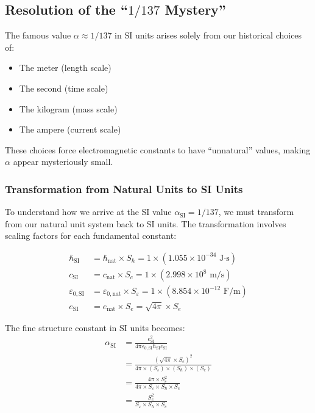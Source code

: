 	\subsection{Resolution of the ``$1/137$ Mystery''}
	
	The famous value $\alpha \approx 1/137$ in SI units arises solely from our historical choices of:
	\begin{itemize}
		\item The meter (length scale)
		\item The second (time scale)  
		\item The kilogram (mass scale)
		\item The ampere (current scale)
	\end{itemize}
	
	These choices force electromagnetic constants to have ``unnatural'' values, making $\alpha$ appear mysteriously small.
	
	\subsubsection{Transformation from Natural Units to SI Units}
	
	To understand how we arrive at the SI value $\alpha_{\text{SI}} = 1/137$, we must transform from our natural unit system back to SI units. The transformation involves scaling factors for each fundamental constant:
	
	\begin{align}
		\hbar_{\text{SI}} &= \hbar_{\text{nat}} \times S_{\hbar} = 1 \times (1.055 \times 10^{-34} \text{ J·s})\\
		c_{\text{SI}} &= c_{\text{nat}} \times S_c = 1 \times (2.998 \times 10^8 \text{ m/s})\\
		\varepsilon_{0,\text{SI}} &= \varepsilon_{0,\text{nat}} \times S_{\varepsilon} = 1 \times (8.854 \times 10^{-12} \text{ F/m})\\
		e_{\text{SI}} &= e_{\text{nat}} \times S_e = \sqrt{4\pi} \times S_e
	\end{align}
	
	The fine structure constant in SI units becomes:
	\begin{align}
		\alpha_{\text{SI}} &= \frac{e_{\text{SI}}^2}{4\pi\varepsilon_{0,\text{SI}}\hbar_{\text{SI}} c_{\text{SI}}}\\
		&= \frac{(\sqrt{4\pi} \times S_e)^2}{4\pi \times (S_{\varepsilon}) \times (S_{\hbar}) \times (S_c)}\\
		&= \frac{4\pi \times S_e^2}{4\pi \times S_{\varepsilon} \times S_{\hbar} \times S_c}\\
		&= \frac{S_e^2}{S_{\varepsilon} \times S_{\hbar} \times S_c}
	\end{align}
	
